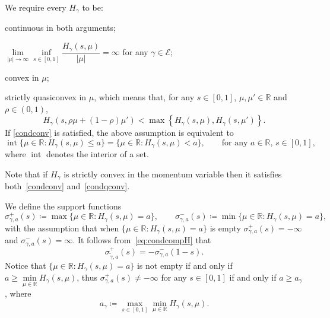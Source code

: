 \documentclass[11pt,a4paper,american]{article}
\DeclareMathOperator{\interior}{int}
\newcommand{\Ecal}{\mathcal E}
\newcommand{\Rds}{\mathds R}
\begin{document}
    We require every $H_\gamma$ to be:
    \begin{Hassum}
        \item\label{condcont} continuous in both arguments;
        \item\label{condsuplin} $\lim\limits_{|\mu|\to\infty}\inf\limits_{s\in [0,1]}\dfrac{H_\gamma(s,\mu)}{|\mu|}=\infty$ for any $\gamma\in\Ecal$;
        \item\label{condconv} convex in $\mu$;
        \item\label{condqconv} strictly quasiconvex in $\mu$, which means that, for any $s\in[0,1]$, $\mu,\mu'\in\Rds$ and $\rho\in(0,1)$,
        \begin{equation*}
            H_\gamma\left(s,\rho\mu+(1-\rho)\mu'\right)<\max\left\{H_\gamma(s,\mu),H_\gamma\left(s,\mu'\right)\right\}.
        \end{equation*}
        If \cref{condconv} is satisfied, the above assumption is equivalent to
        \begin{equation}\label{eq:sublevelH}
            \interior\{\mu\in\Rds:H_\gamma(s,\mu)\le a\}=\{\mu\in\Rds:H_\gamma(s,\mu)<a\},\qquad\text{for any }a\in\Rds,\,s\in[0,1],
        \end{equation}
        where $\interior$ denotes the interior of a set.
    \end{Hassum}
    Note that if $H_\gamma$ is strictly convex in the momentum variable then it satisfies both~\ref{condconv} and~\ref{condqconv}.

    We define the support functions
    \begin{equation}\label{eq:sigmadef}
        \sigma_{\gamma,a}^+(s)\coloneqq\max\{\mu\in\Rds:H_\gamma(s,\mu)=a\},\qquad\sigma_{\gamma,a}^-(s)\coloneqq\min\{\mu\in\Rds:H_\gamma(s,\mu)=a\},
    \end{equation}
    with the assumption that when $\{\mu\in\Rds:H_\gamma(s,\mu)=a\}$ is empty $\sigma_{\gamma,a}^+(s)=-\infty$ and $\sigma_{\gamma,a}^-(s)=\infty$. It follows from~\cref{eq:condcompH} that
    \begin{equation}\label{eq:sigcomp}
        \sigma_{\widetilde\gamma,a}^+(s)=-\sigma_{\gamma,a}^-(1-s).
    \end{equation}
    Notice that $\{\mu\in\Rds:H_\gamma(s,\mu)=a\}$ is not empty if and only if $a\ge\min\limits_{\mu\in\Rds}H_\gamma(s,\mu)$, thus $\sigma_{\gamma,a}^+(s)\ne-\infty$ for any $s\in[0,1]$ if and only if $a\ge a_\gamma$, where
    \begin{equation*}
        a_\gamma\coloneqq\max_{s\in[0,1]}\min_{\mu\in\Rds}H_\gamma(s,\mu).
    \end{equation*}
\end{document}
